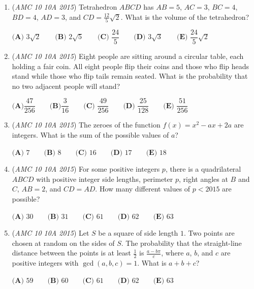 \begin{enumerate}
 A rectangle with side lengths in $\text{cm}$ has an area of integer $A$ $\text{cm}^2$ and a perimeter of integer $P$ $\text{cm}$. Which of the following numbers cannot equal $A+P$?


 $\textbf{(A) }100\qquad\textbf{(B) }102\qquad\textbf{(C) }104\qquad\textbf{(D) }106\qquad\textbf{(E) }108$


	\item (\textit{AMC 10 10A 2015}) Tetrahedron $ABCD$ has $AB=5$, $AC=3$, $BC=4$, $BD=4$, $AD=3$, and $CD=\frac{12}5\sqrt2$.  What is the volume of the tetrahedron?


 $\textbf{(A) }3\sqrt2\qquad\textbf{(B) }2\sqrt5\qquad\textbf{(C) }\dfrac{24}5\qquad\textbf{(D) }3\sqrt3\qquad\textbf{(E) }\dfrac{24}5\sqrt2$


	\item (\textit{AMC 10 10A 2015}) Eight people are sitting around a circular table, each holding a fair coin. All eight people flip their coins and those who flip heads stand while those who flip tails remain seated. What is the probability that no two adjacent people will stand?


 $\textbf{(A)}\dfrac{47}{256}\qquad\textbf{(B)}\dfrac{3}{16}\qquad\textbf{(C) }\dfrac{49}{256}\qquad\textbf{(D) }\dfrac{25}{128}\qquad\textbf{(E) }\dfrac{51}{256}$


	\item (\textit{AMC 10 10A 2015}) The zeroes of the function $f(x)=x^2-ax+2a$ are integers. What is the sum of the possible values of $a$?


 $\textbf{(A) }7\qquad\textbf{(B) }8\qquad\textbf{(C) }16\qquad\textbf{(D) }17\qquad\textbf{(E) }18$


	\item (\textit{AMC 10 10A 2015}) For some positive integers $p$, there is a quadrilateral $ABCD$ with positive integer side lengths, perimeter $p$, right angles at $B$ and $C$, $AB=2$, and $CD=AD$.  How many different values of $p<2015$ are possible?


 $\textbf{(A) }30\qquad\textbf{(B) }31\qquad\textbf{(C) }61\qquad\textbf{(D) }62\qquad\textbf{(E) }63$


	\item (\textit{AMC 10 10A 2015}) Let $S$ be a square of side length $1$.  Two points are chosen at random on the sides of $S$.  The probability that the straight-line distance between the points is at least $\frac12$ is $\frac{a-b\pi}c$, where $a$, $b$, and $c$ are positive integers with $\gcd(a,b,c)=1$.  What is $a+b+c$?


 $\textbf{(A) }59\qquad\textbf{(B) }60\qquad\textbf{(C) }61\qquad\textbf{(D) }62\qquad\textbf{(E) }63$


\end{enumerate}